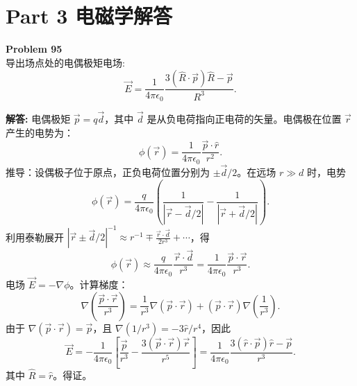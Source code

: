 \documentclass[12pt, a4paper, oneside]{ctexart}
\newenvironment{solution}{\par\noindent\textbf{解答:}\quad}{\par}
\begin{document}
\section*{Part 3 电磁学解答}

\begin{mdframed}[backgroundcolor=gray!10, linewidth=0pt]
    \textbf{Problem 95} \\
    导出场点处的电偶极矩电场:
    \[
    \vec{E} = \frac{1}{4\pi\epsilon_0} \frac{3(\hat{R} \cdot \vec{p}) \hat{R} - \vec{p}}{R^3}.
    \]
\end{mdframed}
\begin{solution}
    电偶极矩 $\vec{p} = q \vec{d}$，其中 $\vec{d}$ 是从负电荷指向正电荷的矢量。电偶极在位置 $\vec{r}$ 产生的电势为：
    \[
    \phi(\vec{r}) = \frac{1}{4\pi\epsilon_0} \frac{\vec{p} \cdot \hat{r}}{r^2}.
    \]
    推导：设偶极子位于原点，正负电荷位置分别为 $\pm \vec{d}/2$。在远场 $r \gg d$ 时，电势
    \[
    \phi(\vec{r}) = \frac{q}{4\pi\epsilon_0} \left( \frac{1}{|\vec{r} - \vec{d}/2|} - \frac{1}{|\vec{r} + \vec{d}/2|} \right).
    \]
    利用泰勒展开 $|\vec{r} \pm \vec{d}/2|^{-1} \approx r^{-1} \mp \frac{\vec{r} \cdot \vec{d}}{2r^3} + \cdots$，得
    \[
    \phi(\vec{r}) \approx \frac{q}{4\pi\epsilon_0} \frac{\vec{r} \cdot \vec{d}}{r^3} = \frac{1}{4\pi\epsilon_0} \frac{\vec{p} \cdot \vec{r}}{r^3}.
    \]
    电场 $\vec{E} = -\nabla \phi$。计算梯度：
    \[
    \nabla \left( \frac{\vec{p} \cdot \vec{r}}{r^3} \right) = \frac{1}{r^3} \nabla (\vec{p} \cdot \vec{r}) + (\vec{p} \cdot \vec{r}) \nabla \left( \frac{1}{r^3} \right).
    \]
    由于 $\nabla (\vec{p} \cdot \vec{r}) = \vec{p}$，且 $\nabla (1/r^3) = -3 \hat{r}/r^4$，因此
    \[
    \vec{E} = -\frac{1}{4\pi\epsilon_0} \left[ \frac{\vec{p}}{r^3} - \frac{3 (\vec{p} \cdot \vec{r}) \vec{r}}{r^5} \right] = \frac{1}{4\pi\epsilon_0} \frac{3(\hat{r} \cdot \vec{p}) \hat{r} - \vec{p}}{r^3}.
    \]
    其中 $\hat{R} = \hat{r}$。得证。
\end{solution}
\end{document}
